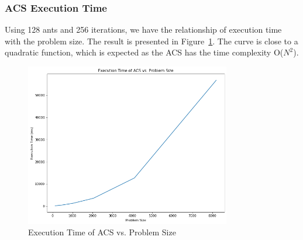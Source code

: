 \documentclass{article}
\begin{document}
\subsubsection{ACS Execution Time}
Using 128 ants and 256 iterations, we have the relationship of execution time with the problem size. The result is presented in Figure~\ref{fig:acs_size}. The curve is close to a quadratic function, which is expected as the ACS has the time complexity O($N^2$).

\begin{figure}
    \centering
    \includegraphics[width=0.8\textwidth]{acs_size.png}
    \caption{Execution Time of ACS vs. Problem Size}
    \label{fig:acs_size}
\end{figure}
\end{document}
